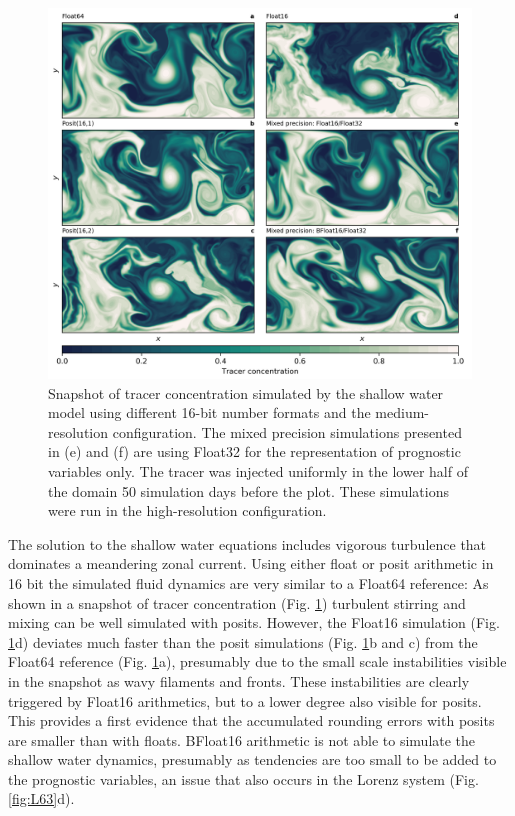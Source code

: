\documentclass[draft]{agujournal2019}
\begin{document}
\begin{figure}
\includegraphics[width=1\textwidth]{snapshot.png}
\caption{Snapshot of tracer concentration simulated by the shallow water model using different 16-bit number formats and the medium-resolution configuration. The mixed precision simulations presented in (e) and (f) are using Float32 for the representation of prognostic variables only. The tracer was injected uniformly in the lower half of the domain 50 simulation days before the plot. These simulations were run in the high-resolution configuration.}
\label{fig:snapshot}
\end{figure}

The solution to the shallow water equations includes vigorous turbulence that dominates a meandering zonal current. Using either float or posit arithmetic in 16 bit the simulated fluid dynamics are very similar to a Float64 reference: As shown in a snapshot of tracer concentration (Fig. \ref{fig:snapshot}) turbulent stirring and mixing can be well simulated with posits. However, the Float16 simulation (Fig. \ref{fig:snapshot}d) deviates much faster than the posit simulations (Fig. \ref{fig:snapshot}b and c) from the Float64 reference (Fig. \ref{fig:snapshot}a), presumably due to the small scale instabilities visible in the snapshot as wavy filaments and fronts. These instabilities are clearly triggered by Float16 arithmetics, but to a lower degree also visible for posits. This provides a first evidence that the accumulated rounding errors with posits are smaller than with floats. BFloat16 arithmetic is not able to simulate the shallow water dynamics, presumably as tendencies are too small to be added to the prognostic variables, an issue that also occurs in the Lorenz system (Fig. \ref{fig:L63}d).
\end{document}
